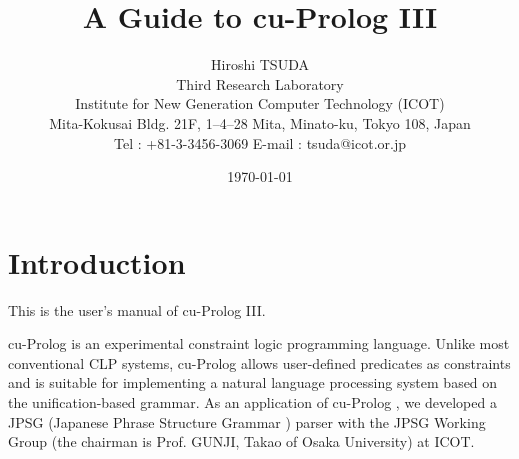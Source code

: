 \setlength{\textwidth}{165mm}
\setlength{\textheight}{250mm}
\setlength{\topmargin}{-1.0in}
\setlength{\evensidemargin}{0in}
\setlength{\oddsidemargin}{0in}

\newtheorem{defs}{[Def]}
\newtheorem{thm}{Theorem}
\newcommand{\cuprolog}{{\sf cu-Prolog }}
\newcommand{\normalskip}{\baselineskip=1.2\normalbaselineskip}
\newcommand{\programskip}{\baselineskip=0.8\normalbaselineskip}
\newcommand{\bcapt}{\small \sf }
\newcommand{\ecapt}{\rm  \normalsize }
\newcommand{\bcat}{\left[ \begin{array}{l}}
\newcommand{\ecat}{\end{array} \right]}
\newcommand{\bscat}{\left \langle \begin{array}{l}}
\newcommand{\escat}{\end{array} \right \rangle}
\newcommand{\bdisj}{\left \{ \begin{array}{l}}
\newcommand{\edisj}{\end{array} \right \}}


\normalskip

\title{A Guide to \cuprolog III}
\author{
Hiroshi TSUDA\\
Third Research Laboratory\\
Institute for New Generation Computer Technology (ICOT)\\
Mita-Kokusai Bldg. 21F, 1--4--28 Mita, Minato-ku, Tokyo 108, Japan\\
Tel : +81-3-3456-3069 \hspace{.5cm}
E-mail : tsuda@icot.or.jp
}
\date{\today}
\maketitle

\tableofcontents
\newpage

\section{Introduction}
This is the user's manual of \cuprolog III\cite{tuda:acl,tuda:lpc}. 

 \cuprolog is an experimental constraint logic programming language.
Unlike most conventional CLP systems, \cuprolog allows user-defined 
predicates as constraints and is suitable for implementing a natural 
language processing system based on the unification-based 
grammar\cite{shi:ub}. As an application of \cuprolog, we developed 
a JPSG (Japanese Phrase Structure Grammar \cite{gun:jpsg}) parser 
with the JPSG Working Group (the chairman is Prof. GUNJI, Takao of
Osaka University) at ICOT. 

